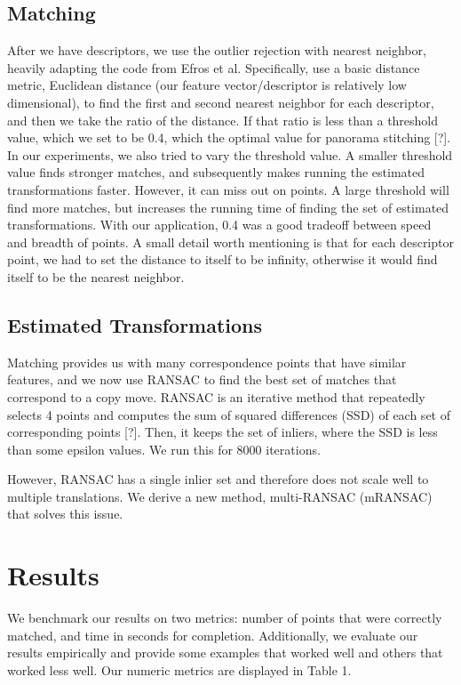 \documentclass[12pt]{article}
\begin{document}
\subsection*{Matching}
After we have descriptors, we use the outlier rejection with nearest neighbor, heavily adapting the code from Efros et al.  Specifically, use a basic distance metric, Euclidean distance (our feature vector/descriptor is relatively low dimensional), to find the first and second nearest neighbor for each descriptor, and then we take the ratio of the distance. If that ratio is less than a threshold value, which we set to be 0.4, which the optimal value for panorama stitching [?]. In our experiments, we also tried to vary the threshold value. A smaller threshold value finds stronger matches, and subsequently makes running the estimated transformations faster. However, it can miss out on points. A large threshold will find more matches, but increases the running time of finding the set of estimated transformations. With our application, 0.4 was a good tradeoff between speed and breadth of points. A small detail worth mentioning is that for each descriptor point, we had to set the distance to itself to be infinity, otherwise it would find itself to be the nearest neighbor. 

\subsection*{Estimated Transformations}
Matching provides us with many correspondence points that have similar features, and we now use RANSAC to find the best set of matches that correspond to a copy move. RANSAC is an iterative method that repeatedly selects 4 points and computes the sum of squared differences (SSD) of each set of corresponding points [?]. Then, it keeps the set of inliers, where the SSD is less than some epsilon values. We run this for 8000 iterations. 

However, RANSAC has a single inlier set and therefore does not scale well to multiple translations. We derive a new method, multi-RANSAC (mRANSAC) that solves this issue. 

\section*{Results}

We benchmark our results on two metrics: number of points that were correctly matched, and time in seconds for completion. Additionally, we evaluate our results empirically and provide some examples that worked well and others that worked less well. Our numeric metrics are displayed in Table 1. 
\end{document}
